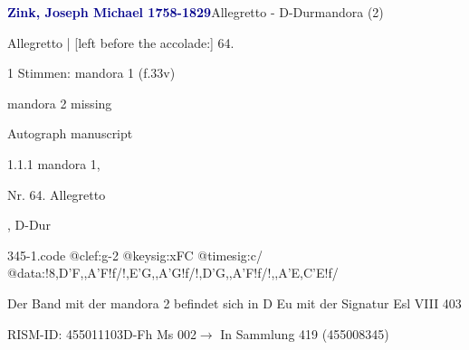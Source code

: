 \documentclass[twocolumn, 12pt]{book}
\begin{document}
\par \vspace{16pt} \textcolor{darkblue}{\textbf{Zink, Joseph Michael  1758-1829}}\hfillplus{\textbf{[345]}}\newline Allegretto - D-Dur\newline mandora (2)
\par \begin{itshape}[f.33v, at left:] Allegretto | [left before the accolade:] 64.\end{itshape} 
\par \textcolor{darkblue}{}  1 Stimmen: mandora 1  (f.33v)\newline \begin{small} mandora 2 missing\end{small} \newline Autograph manuscript
\par 1.1.1  mandora 1, \begin{itshape}Nr. 64. Allegretto\end{itshape}, D-Dur  
\begin{filecontents*}{345-1.code}
@clef:g-2
@keysig:xFC
@timesig:c/
@data:!{8,D'F,,A'F}!f/!{,E'G,,A'G}!f/!{,D'G,,A'F}!f/!{,,A'E,C'E}!f/
\end{filecontents*}
\newline %
\par Der Band mit der mandora 2 befindet sich in D Eu mit der Signatur Esl VIII 403
\par RISM-ID: 455011103\newline D-Fh  Ms 002\newline $\rightarrow$ In Sammlung 419 (455008345)
      
\end{document}
